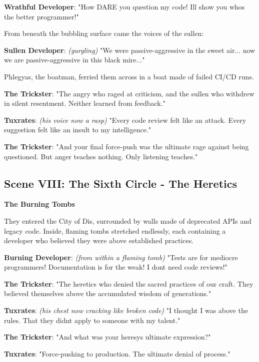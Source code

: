 \textbf{Wrathful Developer}: "How DARE you question my code! I\textquotesingle ll show you who\textquotesingle s the better programmer!"

From beneath the bubbling surface came the voices of the sullen:

\textbf{Sullen Developer}: \emph{(gurgling)} "We were passive-aggressive in the sweet air... now we are passive-aggressive in this black mire..."

Phlegyas, the boatman, ferried them across in a boat made of failed CI/CD runs.

\textbf{The Trickster}: "The angry who raged at criticism, and the sullen who withdrew in silent resentment. Neither learned from feedback."

\textbf{Tuxrates}: \emph{(his voice now a rasp)} "Every code review felt like an attack. Every suggestion felt like an insult to my intelligence."

\textbf{The Trickster}: "And your final force-push was the ultimate rage against being questioned. But anger teaches nothing. Only listening teaches."

\bookdivider

\subsection{Scene VIII: The Sixth Circle - The Heretics}\label{scene-viii-the-sixth-circle---the-heretics}

\textbf{The Burning Tombs}

They entered the City of Dis, surrounded by walls made of deprecated APIs and legacy code. Inside, flaming tombs stretched endlessly, each containing a developer who believed they were above established practices.

\textbf{Burning Developer}: \emph{(from within a flaming tomb)} "Tests are for mediocre programmers! Documentation is for the weak! I don\textquotesingle t need code reviews!"

\textbf{The Trickster}: "The heretics who denied the sacred practices of our craft. They believed themselves above the accumulated wisdom of generations."

\textbf{Tuxrates}: \emph{(his chest now cracking like broken code)} "I thought I was above the rules. That they didn\textquotesingle t apply to someone with my talent."

\textbf{The Trickster}: "And what was your heresy\textquotesingle s ultimate expression?"

\textbf{Tuxrates}: "Force-pushing to production. The ultimate denial of process."


